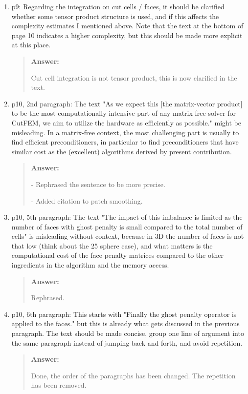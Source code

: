 \documentclass[11pt, a4paper]{article}
\newenvironment{answer}{%
      \begin{quote}%
            \color{blue!80!black}%
            \textbf{Answer:}%
            }{%
      \end{quote}%
}
\begin{document}
\begin{enumerate}[label=\textbullet, wide, labelindent=0pt]
\begin{answer}
                  This has been clarified in the text.
            \end{answer}

      \item p9: Regarding the integration on cut cells / faces, it should be clarified whether some tensor product
            structure is used, and if this affects the complexity estimates I mentioned above. Note that the text at
            the
            bottom of
            page 10 indicates a higher complexity, but this should be made more explicit at this place.
            \begin{answer}
                  Cut cell integration is not tensor product, this is now clarified in the text.
            \end{answer}

      \item p10, 2nd paragraph: The text "As we expect this [the matrix-vector product] to be the most
            computationally intensive part of any matrix-free solver for CutFEM, we aim to utilize the hardware as
            efficiently as
            possible." might be misleading. In a matrix-free context, the most challenging part is usually to find
            efficient
            preconditioners, in particular to find preconditioners that have similar cost as the (excellent) algorithms
            derived by
            present contribution.
            \begin{answer}
                  - Rephrased the sentence to be more precise.

                  - Added citation to patch smoothing.
            \end{answer}

      \item p10, 5th paragraph: The text "The impact of this imbalance is limited as the number of faces with ghost
            penalty is small compared to the total number of cells" is misleading without context, because in 3D the
            number of
            faces is not that low (think about the 25 sphere case), and what matters is the computational cost of the
            face penalty
            matrices compared to the other ingredients in the algorithm and the memory access.
            \begin{answer}
                  Rephrased.
            \end{answer}

      \item p10, 6th paragraph: This starts with "Finally the ghost penalty operator is applied to the faces." but
            this is already what gets discussed in the previous paragraph. The text should be made concise, group one
            line of
            argument into the same paragraph instead of jumping back and forth, and avoid repetition.
            \begin{answer}
                  Done, the order of the paragraphs has been changed.
                  The repetition has been removed.
            \end{answer}


\end{enumerate}
\end{document}

